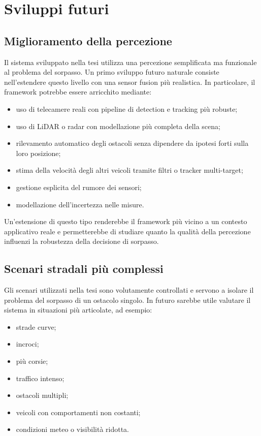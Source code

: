 \chapter{Sviluppi futuri}

\section{Miglioramento della percezione}

Il sistema sviluppato nella tesi utilizza una percezione semplificata ma funzionale al problema del sorpasso. Un primo sviluppo futuro naturale consiste nell'estendere questo livello con una sensor fusion più realistica. In particolare, il framework potrebbe essere arricchito mediante:

\begin{itemize}
    \item uso di telecamere reali con pipeline di detection e tracking più robuste;
    \item uso di LiDAR o radar con modellazione più completa della scena;
    \item rilevamento automatico degli ostacoli senza dipendere da ipotesi forti sulla loro posizione;
    \item stima della velocità degli altri veicoli tramite filtri o tracker multi-target;
    \item gestione esplicita del rumore dei sensori;
    \item modellazione dell'incertezza nelle misure.
\end{itemize}

Un'estensione di questo tipo renderebbe il framework più vicino a un contesto applicativo reale e permetterebbe di studiare quanto la qualità della percezione influenzi la robustezza della decisione di sorpasso.

\section{Scenari stradali più complessi}

Gli scenari utilizzati nella tesi sono volutamente controllati e servono a isolare il problema del sorpasso di un ostacolo singolo. In futuro sarebbe utile valutare il sistema in situazioni più articolate, ad esempio:

\begin{itemize}
    \item strade curve;
    \item incroci;
    \item più corsie;
    \item traffico intenso;
    \item ostacoli multipli;
    \item veicoli con comportamenti non costanti;
    \item condizioni meteo o visibilità ridotta.
\end{itemize}

